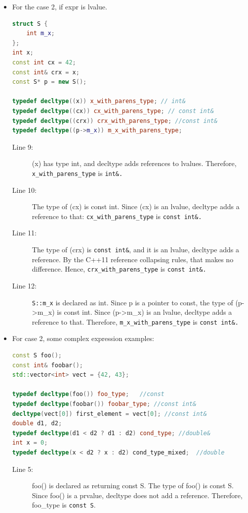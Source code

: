 \documentclass[a4paper,11pt,twoside]{book}
\begin{document}
\begin{itemize}
	\item For the case 2, if expr is lvalue.
\begin{lstlisting}[frame=single, language=c++]
struct S {
	int m_x;
};
int x;
const int cx = 42;
const int& crx = x;
const S* p = new S();

typedef decltype((x)) x_with_parens_type; // int&
typedef decltype((cx)) cx_with_parens_type; // const int&
typedef decltype((crx)) crx_with_parens_type; //const int&
typedef decltype((p->m_x)) m_x_with_parens_type; 
\end{lstlisting}
	\begin{description}
		\item[Line 9:]  (x) has type int, and decltype adds references to lvalues. Therefore, \texttt{x\_with\_parens\_type} is \texttt{int\&.}
		
		\item[Line 10:] The type of (cx) is const int. Since (cx) is an lvalue, decltype adds a reference to that: \texttt{cx\_with\_parens\_type} is \texttt{const int\&.}
		
		\item[Line 11:]  The type of (crx) is \texttt{const int\&}, and it is an lvalue, decltype adds a reference. By the C++11 reference collapsing rules, that makes no difference. Hence, \texttt{crx\_with\_parens\_type} is \texttt{const int\&.}
		
		\item[Line 12:] \texttt{S::m\_x} is declared as int. Since p is a pointer to const, the type of (p->m\_x) is const int. Since (p->m\_x) is an lvalue, decltype adds a reference to that. Therefore, \texttt{m\_x\_with\_parens\_type} is \texttt{const int\&.}
	\end{description}

\item For case 2, some complex expression examples:
\begin{lstlisting}[frame=single, language=c++]
const S foo();
const int& foobar();
std::vector<int> vect = {42, 43};

typedef decltype(foo()) foo_type;   //const
typedef decltype(foobar()) foobar_type; //const int&
decltype(vect[0]) first_element = vect[0]; //const int&
double d1, d2;
typedef decltype(d1 < d2 ? d1 : d2) cond_type; //double&
int x = 0;
typedef decltype(x < d2 ? x : d2) cond_type_mixed;  //double
\end{lstlisting}

	\begin{description}
		\item[Line 5:] foo() is declared as returning const S. The type of foo()
is const S. Since foo() is a prvalue, decltype does not
add a reference. Therefore, foo\_type is \texttt{const S}.
		

\end{description}
\end{itemize}
\end{document}
